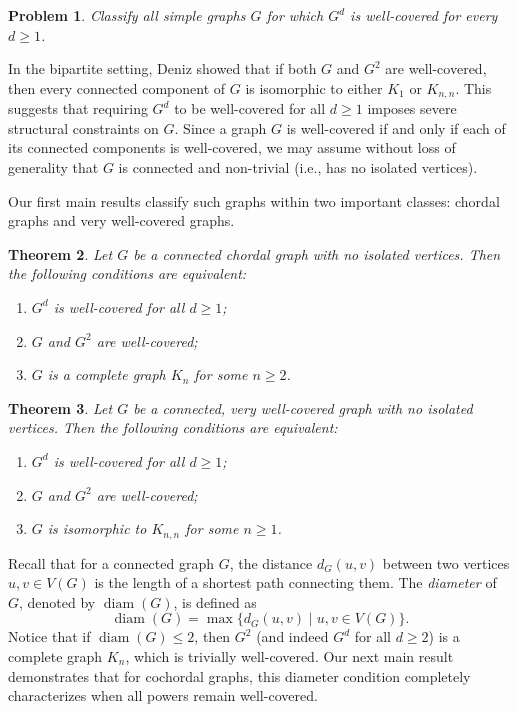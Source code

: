 \documentclass[10pt,a4paper]{amsart}
\numberwithin{equation}{section}
\newtheorem{thm}{\bf Theorem}[section]
\newtheorem{prob}[thm]{\bf Problem}
\theoremstyle{definition}
\begin{document}
\begin{prob}
Classify all simple graphs $G$ for which $G^d$ is well-covered for every $d \ge 1$.
\end{prob}

In the bipartite setting, Deniz \cite{D} showed that if both $G$ and $G^2$ are well-covered, then every connected component of $G$ is isomorphic to either $K_1$ or $K_{n,n}$. This suggests that requiring $G^d$ to be well-covered for all $d \ge 1$ imposes severe structural constraints on $G$. Since a graph $G$ is well-covered if and only if each of its connected components is well-covered, we may assume without loss of generality that $G$ is connected and non-trivial (i.e., has no isolated vertices). 

Our first main results classify such graphs within two important classes: chordal graphs and very well-covered graphs.


\begin{thm}\label{thm_chordal}
Let $G$ be a connected chordal graph with no isolated vertices. Then the following conditions are equivalent:
\begin{enumerate}
    \item $G^d$ is well-covered for all $d \ge 1$;
    \item $G$ and $G^2$ are well-covered;
    \item $G$ is a complete graph $K_n$ for some $n \ge 2$.
\end{enumerate}
\end{thm}



\begin{thm}\label{thm_very_well}
Let $G$ be a connected, very well-covered graph with no isolated vertices. Then the following conditions are equivalent:
\begin{enumerate}
    \item $G^d$ is well-covered for all $d \ge 1$;
    \item $G$ and $G^2$ are well-covered;
    \item $G$ is isomorphic to $K_{n,n}$ for some $n \ge 1$.
\end{enumerate}
\end{thm}


Recall that for a connected graph $G$, the distance $d_G(u, v)$ between two vertices $u, v \in V(G)$ is the length of a shortest path connecting them. The \emph{diameter} of $G$, denoted by $\operatorname{diam}(G)$, is defined as
\[
\operatorname{diam}(G) = \max \{ d_G(u, v) \mid u, v \in V(G) \}.
\]
Notice that if $\operatorname{diam}(G) \le 2$, then $G^2$ (and indeed $G^d$ for all $d \ge 2$) is a complete graph $K_n$, which is trivially well-covered. Our next main result demonstrates that for cochordal graphs, this diameter condition completely characterizes when all powers remain well-covered.
\end{document}
